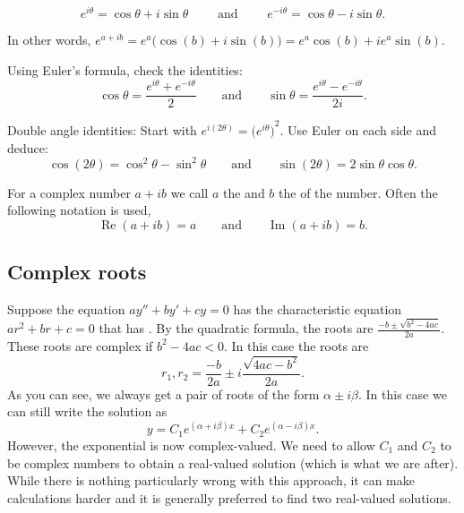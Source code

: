 \begin{theorem} \label{eulersformula}
\begin{equation*}
\boxed{~~
e^{i \theta} = \cos \theta + i \sin \theta
\qquad \text{ and } \qquad
e^{- i \theta} = \cos \theta - i \sin \theta .
~~}
\end{equation*}
\end{theorem}

In other words, $e^{a+ib} = e^a \bigl( \cos(b) + i \sin(b) \bigr) = e^a \cos(b) + i e^a \sin(b)$.

\begin{exercise}
Using Euler's formula, check the identities:
\begin{equation*}
\cos \theta = \frac{e^{i \theta} + e^{-i \theta}}{2}
\qquad \text{and} \qquad
\sin \theta = \frac{e^{i \theta} - e^{-i \theta}}{2i}.
\end{equation*}
\end{exercise}

\begin{exercise}
Double angle identities:
Start with $e^{i(2\theta)} = {\bigl(e^{i \theta} \bigr)}^2$.  Use Euler on
each side and deduce:
\begin{equation*}
\cos (2\theta) = \cos^2 \theta - \sin^2 \theta
\qquad \text{and} \qquad
\sin (2\theta) = 2 \sin \theta \cos \theta .
\end{equation*}
\end{exercise}

For a complex number $a+ib$ we call
$a$ the \emph{} and $b$ the \emph{} of the number.
Often the following notation is used,
\begin{equation*}
\operatorname{Re}(a+ib) = a
\qquad \text{and} \qquad
\operatorname{Im}(a+ib) = b.
\end{equation*}

\subsection{Complex roots}

Suppose the equation $ay'' + by' + cy = 0$ has the 
characteristic equation
$a r^2 + b r + c = 0$ that has .
By the quadratic
formula, the roots are
$\frac{-b \pm \sqrt{b^2 - 4ac}}{2a}$.
These roots are complex if $b^2 - 4ac < 0$.  In this case the
roots are
\begin{equation*}
r_1, r_2 = \frac{-b}{2a} \pm i\frac{\sqrt{4ac - b^2}}{2a} .
\end{equation*}
As you can see, we always get a pair of roots of the form $\alpha \pm i
\beta$.  In this case we can still write the solution as
\begin{equation*}
y = C_1 e^{(\alpha+i\beta)x} + C_2 e^{(\alpha-i\beta)x} .
\end{equation*}
However, the exponential is now complex-valued.  We need to allow
$C_1$ and $C_2$ to be complex numbers to obtain a real-valued solution (which
is what we are after).  While there is nothing particularly wrong with this
approach,
it can make calculations harder and it is generally preferred
to find two real-valued
solutions.

